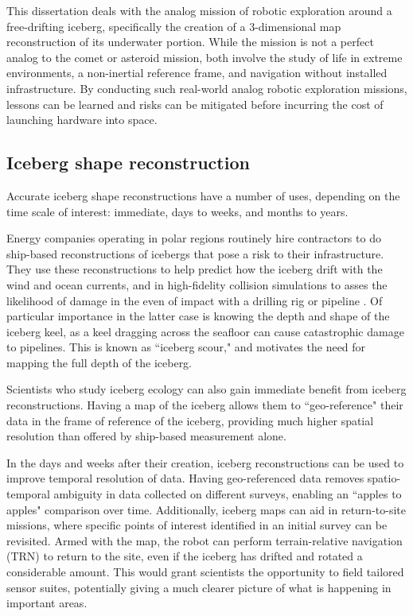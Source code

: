 This dissertation deals with the analog mission of robotic exploration around a free-drifting iceberg, specifically the creation of a 3-dimensional map reconstruction of its underwater portion. While the mission is not a perfect analog to the comet or asteroid mission, both involve the study of life in extreme environments, a non-inertial reference frame, and navigation without installed infrastructure.  By conducting such real-world analog robotic exploration missions, lessons can be learned and risks can be mitigated before incurring the cost of launching hardware into space. 

\subsection{Iceberg shape reconstruction}

Accurate iceberg shape reconstructions have a number of uses, depending on the time scale of interest: immediate, days to weeks, and months to years. 

Energy companies operating in polar regions routinely hire contractors to do ship-based reconstructions of icebergs that pose a risk to their infrastructure. They use these reconstructions to help predict how the iceberg drift with the wind and ocean currents, and in high-fidelity collision simulations to asses the likelihood of damage in the even of impact with a drilling rig or pipeline \cite{ralph2008iceberg} \cite{fuglem1996iceberg}. Of particular importance in the latter case is knowing the depth and shape of the iceberg keel, as a keel dragging across the seafloor can cause catastrophic damage to pipelines. This is known as ``iceberg scour," and motivates the need for mapping the full depth of the iceberg.

Scientists who study iceberg ecology can also gain immediate benefit from iceberg reconstructions. Having a map of the iceberg allows them to ``geo-reference" their data in the frame of reference of the iceberg, providing much higher spatial resolution than offered by ship-based measurement alone.

In the days and weeks after their creation, iceberg reconstructions can be used to improve temporal resolution of data. Having geo-referenced data removes spatio-temporal ambiguity in data collected on different surveys, enabling an ``apples to apples" comparison over time. Additionally, iceberg maps can aid in return-to-site missions, where specific points of interest identified in an initial survey can be revisited. Armed with the map, the robot can perform terrain-relative navigation (TRN) to return to the site, even if the iceberg has drifted and rotated a considerable amount. This would grant scientists the opportunity to field tailored sensor suites, potentially giving a much clearer picture of what is happening in important areas.

